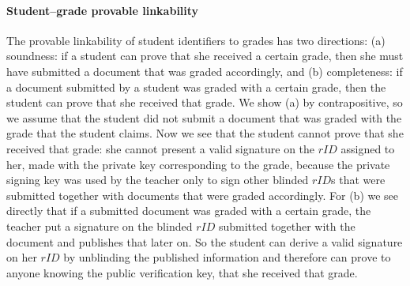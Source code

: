 \paragraph{Student--grade provable linkability}
The provable linkability of student identifiers to grades has two
directions: (a) soundness: if a student can prove that she received a certain
grade, then she must have submitted a document that was graded
accordingly, and (b) completeness: if a document submitted by a student was graded
with a certain grade, then the student can prove that she received that
grade. 
%
We show (a) by contrapositive, so we assume that the student did not
submit a document that was graded with the grade that the student
claims. Now we see that the student cannot prove that she received
that grade: she cannot present a valid signature on the $rID$
assigned to her, made with the private key corresponding to the grade,
because the private signing key was used by the teacher only to sign
other blinded $rID$s that were submitted together with documents that
were graded accordingly.
%
For (b) we see directly that if a submitted document was graded with a
certain grade, the teacher put a signature on the blinded $rID$
submitted together with the document and publishes that later on. So the
student can derive a valid signature on her $rID$ by unblinding the
published information and therefore can prove to anyone knowing the
public verification key, that she received that grade.


